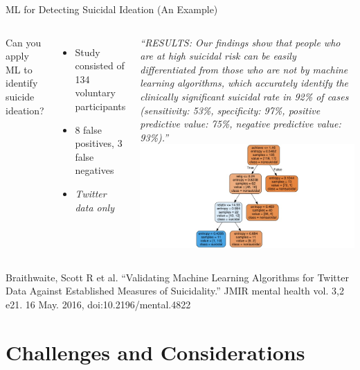 \documentclass[nobackground,dvipsnames,table]{beamer}
\begin{document}
\begin{frame}{ML for Detecting Suicidal Ideation (An Example)}
    \begin{columns}
            \small
            Can you apply ML to identify suicide ideation?
            \begin{itemize}
                \small
                \item Study consisted of 134 voluntary participants
                \item 8 false positives, 3 false negatives
                \item \textit{Twitter data only}
            \end{itemize}
            \vspace{0.05\textheight}
            \tiny
            \textit{“RESULTS: Our findings show that people who are at high suicidal risk can be easily differentiated from those who are not by machine learning algorithms, which accurately identify the clinically significant suicidal rate in 92\% of cases (sensitivity: 53\%, specificity: 97\%, positive predictive value: 75\%, negative predictive value: 93\%).”}
            \includegraphics[width=\textwidth]{ml-identification}
    \end{columns}
    \vspace{0.02\textheight}
    \tiny
    Braithwaite, Scott R et al. “Validating Machine Learning Algorithms for Twitter Data Against Established Measures of Suicidality.” JMIR mental health vol. 3,2 e21. 16 May. 2016, doi:10.2196/mental.4822
\end{frame}

\section{Challenges and Considerations}
\end{document}

